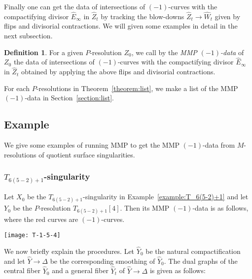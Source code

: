 \documentclass[reqno, twoside, a4paper]{amsart}
\theoremstyle{definition}
\newtheorem{definition}[theorem]{Definition}
\numberwithin{equation}{section}
\begin{document}
Finally one can get the data of intersections of $(-1)$-curves with the compactifying divisor $\widehat{E}_{\infty}$ in $\widehat{Z}_t$ by tracking the blow-downs $\widehat{Z}_t \to \widehat{W}_t$ given by flips and divisorial contractions. We will given some examples in detail in the next subsection.

\begin{definition}
For a given $P$-resolution $Z_0$, we call by the \emph{MMP $(-1)$-data} of $Z_0$ the data of intersections of $(-1)$-curves with the compactifying divisor $\widehat{E}_{\infty}$ in $\widehat{Z}_t$ obtained by applying the above flips and divisorial contractions.
\end{definition}

For each $P$-resolutions in Theorem~\ref{theorem:list}, we make a list of the MMP $(-1)$-data in Section~\ref{section:list}.






\subsection{Example}

We give some examples of running MMP to get the MMP $(-1)$-data from $M$-resolutions of quotient surface singularities.






\subsubsection{$T_{6(5-2)+1}$-singularity}

Let $X_0$ be the $T_{6(5-2)+1}$-singularity in Example~\ref{example:T_6(5-2)+1} and let $Y_0$ be the $P$-resolution $T_{6(5-2)+1}[4]$. Then its MMP $(-1)$-data is as follows, where the red curves are $(-1)$-curves.

\begin{center}
\texttt{[image: T-1-5-4]}
\end{center}

We now briefly explain the procedures. Let $\widehat{Y}_0$ be the natural compactification and let $\widehat{Y} \to \Delta$ be the corresponding smoothing  of $\widehat{Y}_0$. The dual graphs of the central fiber $\widehat{Y}_0$ and a general fiber $\widehat{Y}_t$ of $\widehat{Y} \to \Delta$ is given as follows:
\end{document}
